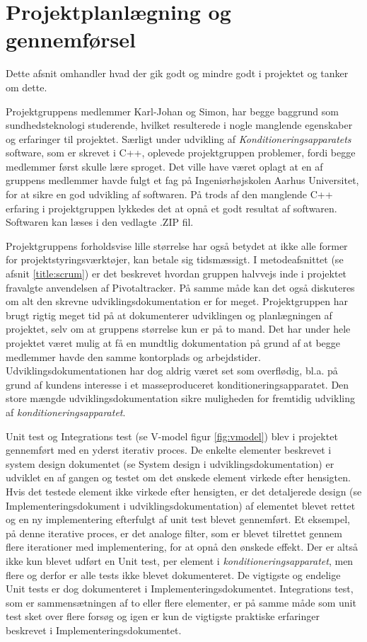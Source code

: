 \section{Projektplanlægning og gennemførsel}
Dette afsnit omhandler hvad der gik godt og mindre godt i projektet og tanker om dette.

Projektgruppens medlemmer Karl-Johan og Simon, har begge baggrund som sundhedsteknologi studerende, hvilket resulterede i nogle manglende egenskaber og erfaringer til projektet. Særligt under udvikling af \textit{Konditioneringsapparatets} software, som er skrevet i C++, oplevede projektgruppen problemer, fordi begge medlemmer først skulle lære sproget. Det ville have været oplagt at en af gruppens medlemmer havde fulgt et fag på Ingeniørhøjskolen Aarhus Universitet, for at sikre en god udvikling af softwaren. På trods af den manglende C++ erfaring i projektgruppen lykkedes det at opnå et godt resultat af softwaren. Softwaren kan læses i den vedlagte .ZIP fil.

Projektgruppens forholdsvise lille størrelse har også betydet at ikke alle former for projektstyringsværktøjer, kan betale sig tidsmæssigt. I metodeafsnittet (se afsnit \ref{title:scrum}) er det beskrevet hvordan gruppen halvvejs inde i projektet fravalgte anvendelsen af Pivotaltracker. På samme måde kan det også diskuteres om alt den skrevne udviklingsdokumentation er for meget. Projektgruppen har brugt rigtig meget tid på at dokumenterer udviklingen og planlægningen af projektet, selv om at gruppens størrelse kun er på to mand. Det har under hele projektet været mulig at få en mundtlig dokumentation på grund af at begge medlemmer havde den samme kontorplads og arbejdstider.
Udviklingsdokumentationen har dog aldrig været set som overflødig, bl.a. på grund af kundens interesse i et masseproduceret konditioneringsapparatet. Den store mængde udviklingsdokumentation sikre muligheden for fremtidig udvikling af \textit{konditioneringsapparatet}. 

Unit test og Integrations test (se V-model figur \ref{fig:vmodel}) blev i projektet gennemført med en yderst iterativ proces. De enkelte elementer beskrevet i system design dokumentet (se System design i udviklingsdokumentation) er udviklet en af gangen og testet om det ønskede element virkede efter hensigten. Hvis det testede element ikke virkede efter hensigten, er det detaljerede design (se Implementeringsdokument i udviklingsdokumentation) af elementet blevet rettet og en ny implementering efterfulgt af unit test blevet gennemført. Et eksempel, på denne iterative proces, er det analoge filter, som er blevet tilrettet gennem flere iterationer med implementering, for at opnå den ønskede effekt. Der er altså ikke kun blevet udført en Unit test, per element i \textit{konditioneringsapparatet}, men flere og derfor er alle tests ikke blevet dokumenteret. De vigtigste og endelige Unit tests er dog dokumenteret i Implementeringsdokumentet. Integrations test, som er sammensætningen af to eller flere elementer, er på samme måde som unit test sket over flere forsøg og igen er kun de vigtigste praktiske erfaringer beskrevet i Implementeringsdokumentet.

